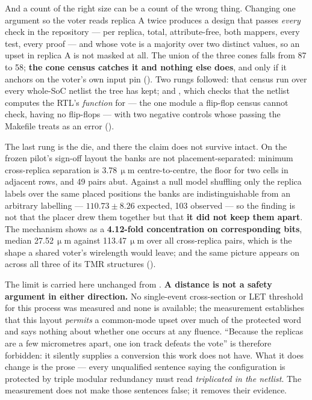 And a count of the right size can be a count of the wrong thing.
Changing one argument so the voter reads replica A twice produces a
design that passes \emph{every} check in the repository --- per replica,
total, attribute-free, both mappers, every test, every proof --- and
whose vote is a majority over two distinct values, so an upset in
replica A is not masked at all. The union of the three cones falls from
87 to 58; \textbf{the cone census catches it and nothing else does}, and
only if it anchors on the voter's own input pin
(). Two rungs followed: that census run over
every whole-SoC netlist the tree has kept; and , which
checks that the netlist computes the RTL's \emph{function} for
 --- the one module a flip-flop census cannot check,
having no flip-flops --- with two negative controls whose passing the
Makefile treats as an error ().

The last rung is the die, and there the claim does not survive intact.
On the frozen pilot's sign-off layout the banks are not
placement-separated: minimum cross-replica separation is
3.78\,$\upmu$m centre-to-centre, the floor for two cells in
adjacent rows, and 49 pairs abut. Against a null model shuffling only
the replica labels over the same placed positions the banks are
indistinguishable from an arbitrary labelling --- $110.73 \pm 8.26$
expected, 103 observed --- so the finding is not that the placer drew
them together but that \textbf{it did not keep them apart}. The mechanism shows as a
\textbf{4.12-fold concentration on corresponding bits}, median
27.52\,$\upmu$m against 113.47\,$\upmu$m over all
cross-replica pairs, which is the shape a shared voter's wirelength
would leave; and the same picture appears on  across all
three of its TMR structures ().

The limit is carried here unchanged from .
\textbf{A distance is not a safety argument in either direction.} No
single-event cross-section or LET threshold for this process was
measured and none is available; the measurement establishes that this
layout \emph{permits} a common-mode upset over much of the protected
word~\cite{mitra2002} and says nothing about whether one occurs at any
fluence.
``Because the replicas are a few micrometres apart, one ion track
defeats the vote'' is therefore forbidden: it silently supplies a
conversion this work does not have. What it does change is the prose ---
every unqualified sentence saying the configuration is protected by
triple modular redundancy must read \emph{triplicated in the netlist}.
The measurement does not make those sentences false; it removes their
evidence.

